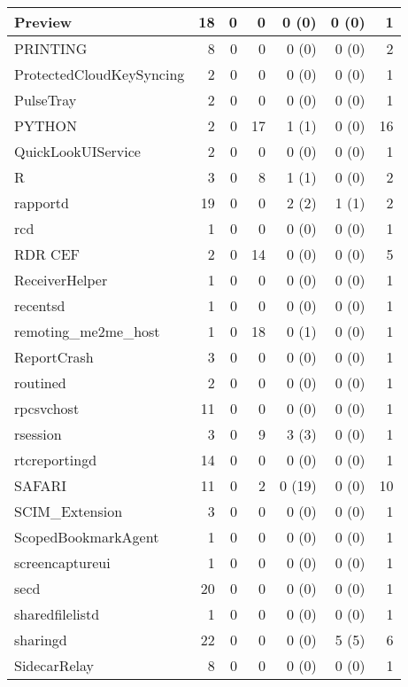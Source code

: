 \begin{adjustwidth}{-2in}{}
\begin{scriptsize}
\begin{longtable}[l]{ l | r | r | r | r | r | r }
    Preview & 18 &  0 &  0 &  0 (0) &  0 (0) &  1 \\ \hline
    PRINTING & 8 &  0 &  0 &  0 (0) &  0 (0) &  2 \\ \hline
    ProtectedCloudKeySyncing & 2 &  0 &  0 &  0 (0) &  0 (0) &  1 \\ \hline
    PulseTray &  2 &  0 &  0 &  0 (0) &  0 (0) &  1 \\ \hline
    PYTHON & 2 &  0 & 17 &  1 (1) &  0 (0) & 16 \\ \hline
    QuickLookUIService & 2 &  0 &  0 &  0 (0) &  0 (0) &  1 \\ \hline
    R &  3 &  0 &  8 &  1 (1) &  0 (0) &  2 \\ \hline
    rapportd &  19 &  0 &  0 &  2 (2) &  1 (1) &  2 \\ \hline
    rcd &  1 &  0 &  0 &  0 (0) &  0 (0) &  1 \\ \hline
    RDR CEF &  2 &  0 & 14 &  0 (0) &  0 (0) &  5 \\ \hline
    ReceiverHelper & 1 &  0 &  0 &  0 (0) &  0 (0) &  1 \\ \hline
    recentsd & 1 &  0 &  0 &  0 (0) &  0 (0) &  1 \\ \hline
    remoting\_me2me\_host &  1 &  0 & 18 &  0 (1) &  0 (0) &  1 \\ \hline
    ReportCrash &  3 &  0 &  0 &  0 (0) &  0 (0) &  1 \\ \hline
    routined & 2 &  0 &  0 &  0 (0) &  0 (0) &  1 \\ \hline
    rpcsvchost &  11 &  0 &  0 &  0 (0) &  0 (0) &  1 \\ \hline
    rsession & 3 &  0 &  9 &  3 (3) &  0 (0) &  1 \\ \hline
    rtcreportingd & 14 &  0 &  0 &  0 (0) &  0 (0) &  1 \\ \hline
    SAFARI &  11 &  0 &  2 & 0 (19) &  0 (0) & 10 \\ \hline
    SCIM\_Extension & 3 &  0 &  0 &  0 (0) &  0 (0) &  1 \\ \hline
    ScopedBookmarkAgent &  1 &  0 &  0 &  0 (0) &  0 (0) &  1 \\ \hline
    screencaptureui &  1 &  0 &  0 &  0 (0) &  0 (0) &  1 \\ \hline
    secd &  20 &  0 &  0 &  0 (0) &  0 (0) &  1 \\ \hline
    sharedfilelistd &  1 &  0 &  0 &  0 (0) &  0 (0) &  1 \\ \hline
    sharingd &  22 &  0 &  0 &  0 (0) &  5 (5) &  6 \\ \hline
    SidecarRelay & 8 &  0 &  0 &  0 (0) &  0 (0) &  1 \\ \hline

\end{longtable}
\end{scriptsize}
\end{adjustwidth}
